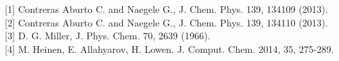 \documentclass[a0paper,portrait]{baposter}
\begin{document}
\begin{poster}
{}
{
%
%
[1] Contreras Aburto C. and Naegele G., J. Chem. Phys. 139, 134109 (2013).\\

[2] Contreras Aburto C. and Naegele G., J. Chem. Phys. 139, 134110 (2013).\\

[3] D. G. Miller, J. Phys. Chem. 70, 2639 (1966).\\

[4] M. Heinen, E. Allahyarov, H. Lowen. J. Comput. Chem. 2014, 35, 275-289.
}


\end{poster}
\end{document}
